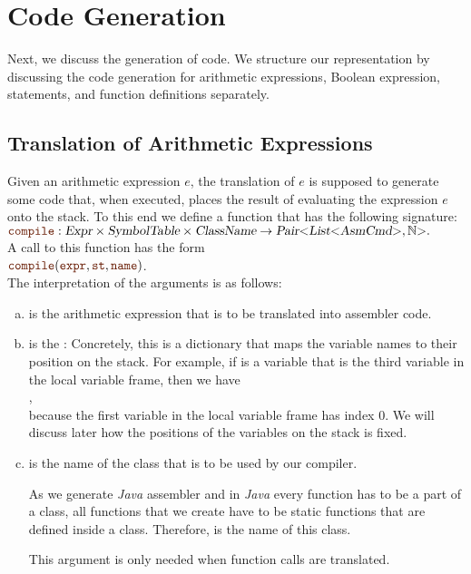 \section{Code Generation}
Next, we discuss the generation of code.  We structure our representation by discussing the code generation for
arithmetic expressions, Boolean expression, statements, and function definitions separately. 

\subsection{Translation of Arithmetic Expressions}
Given an arithmetic expression $e$, the translation of $e$ is supposed to generate some code that, when
executed, places the result of evaluating the expression $e$ onto the stack.  To this end we define a function
 that has the following signature:
\\[0.2cm]
\hspace*{1.3cm}
$\mytt{compile}: \textsl{Expr} \times \textsl{SymbolTable} \times \textsl{ClassName} \rightarrow 
                 \textsl{Pair}\mathtt{<}\textsl{List}\mathtt{<}\textsl{AsmCmd}\mathtt{>}, \mathbb{N}\mathtt{>}.$
\\[0.2cm]
A call to this function has the form
\\[0.2cm]
\hspace*{1.3cm}
$\mytt{compile}(\mytt{expr}, \mytt{st}, \mytt{name})$.
\\[0.2cm]
The interpretation of the arguments is as follows:
\begin{enumerate}[(a)]
\item {} is the arithmetic expression that is to be translated into assembler code.
\item {} is the :  Concretely, this is a dictionary that maps
      the variable names to their position on the stack.  For example, if  is a variable that is the
      third variable in the local variable frame, then we have
      \\[0.2cm]
      \hspace*{1.3cm}
      ,
      \\[0.2cm]
      because the first variable in the local variable frame has index 0.  We will discuss later how the 
      positions of the variables on the stack is fixed.
\item {} is the name of the class that is to be used by our compiler.

     As we generate \textsl{Java} assembler and in \textsl{Java} every function has to be a part of a class,
     all functions that we create have to be static functions that are defined inside a class.  Therefore,
      is the name of this class.

     This argument  is only needed when function calls are translated.
\end{enumerate}
